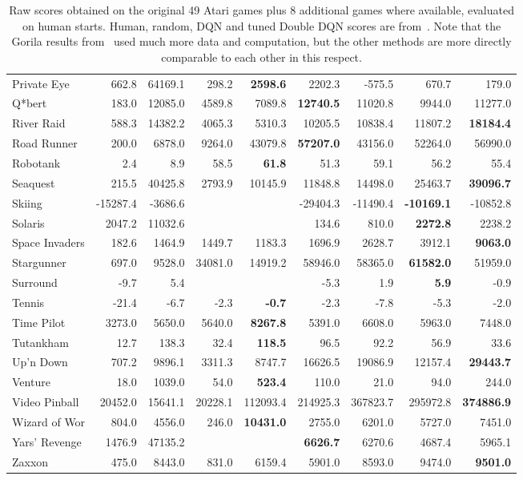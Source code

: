 \documentclass[a4paper]{article}
\begin{document}
\begin{table*}[p]
{{\begin{tabular}{|l|rr|rrr|rrr|}
Private Eye  & 662.8 & 64169.1 & 298.2 & \textbf{2598.6} & 2202.3 & -575.5 & 670.7 & 179.0\\
Q*bert  & 183.0 & 12085.0 & 4589.8 & 7089.8 & \textbf{12740.5} & 11020.8 & 9944.0 & 11277.0\\
River Raid  & 588.3 & 14382.2 & 4065.3 & 5310.3 & 10205.5 & 10838.4 & 11807.2 & \textbf{18184.4}\\
Road Runner  & 200.0 & 6878.0 & 9264.0 & 43079.8 & \textbf{57207.0} & 43156.0 & 52264.0 & 56990.0\\
Robotank  & 2.4 & 8.9 & 58.5 & \textbf{61.8} & 51.3 & 59.1 & 56.2 & 55.4\\
Seaquest  & 215.5 & 40425.8 & 2793.9 & 10145.9 & 11848.8 & 14498.0 & 25463.7 & \textbf{39096.7}\\
Skiing  & -15287.4 & -3686.6 &  &  & -29404.3 & -11490.4 & \textbf{-10169.1} & -10852.8\\
Solaris  & 2047.2 & 11032.6 &  &  & 134.6 & 810.0 & \textbf{2272.8} & 2238.2\\
Space Invaders  & 182.6 & 1464.9 & 1449.7 & 1183.3 & 1696.9 & 2628.7 & 3912.1 & \textbf{9063.0}\\
Stargunner  & 697.0 & 9528.0 & 34081.0 & 14919.2 & 58946.0 & 58365.0 & \textbf{61582.0} & 51959.0\\
Surround  & -9.7 & 5.4 &  &  & -5.3 & 1.9 & \textbf{5.9} & -0.9\\
Tennis  & -21.4 & -6.7 & -2.3 & \textbf{-0.7} & -2.3 & -7.8 & -5.3 & -2.0\\
Time Pilot  & 3273.0 & 5650.0 & 5640.0 & \textbf{8267.8} & 5391.0 & 6608.0 & 5963.0 & 7448.0\\
Tutankham  & 12.7 & 138.3 & 32.4 & \textbf{118.5} & 96.5 & 92.2 & 56.9 & 33.6\\
Up'n Down  & 707.2 & 9896.1 & 3311.3 & 8747.7 & 16626.5 & 19086.9 & 12157.4 & \textbf{29443.7}\\
Venture  & 18.0 & 1039.0 & 54.0 & \textbf{523.4} & 110.0 & 21.0 & 94.0 & 244.0\\
Video Pinball  & 20452.0 & 15641.1 & 20228.1 & 112093.4 & 214925.3 & 367823.7 & 295972.8 & \textbf{374886.9}\\
Wizard of Wor  & 804.0 & 4556.0 & 246.0 & \textbf{10431.0} & 2755.0 & 6201.0 & 5727.0 & 7451.0\\
Yars' Revenge  & 1476.9 & 47135.2 &  &  & \textbf{6626.7} & 6270.6 & 4687.4 & 5965.1\\
Zaxxon  & 475.0 & 8443.0 & 831.0 & 6159.4 & 5901.0 & 8593.0 & 9474.0 & \textbf{9501.0}\\
\hline
\end{tabular}



} } 

\caption{
\label{tab-atari-raw-30human}
Raw scores obtained on the original 49 Atari games plus 8 additional games where available, evaluated on human starts.  Human, random, DQN and tuned Double DQN scores are from~\citet{double-dqn}.  Note that the Gorila results from~\citet{gorila} used much more data and computation, but the other methods are more directly comparable to each other in this respect.
}

\end{table*}
\end{document}
